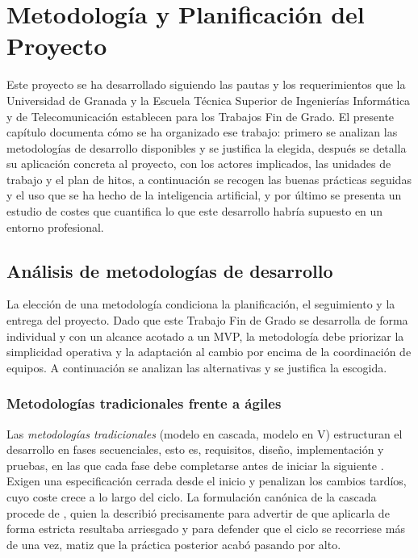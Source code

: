 \chapter{Metodología y Planificación del Proyecto}
\label{cap:metodologia}

Este proyecto se ha desarrollado siguiendo las pautas y los requerimientos que la Universidad de Granada y
la Escuela Técnica Superior de Ingenierías Informática y de Telecomunicación establecen para los Trabajos
Fin de Grado. El presente capítulo documenta cómo se ha organizado ese trabajo: primero se analizan las
metodologías de desarrollo disponibles y se justifica la elegida, después se detalla su aplicación concreta
al proyecto, con los actores implicados, las unidades de trabajo y el plan de hitos, a continuación se
recogen las buenas prácticas seguidas y el uso que se ha hecho de la inteligencia artificial, y por último se
presenta un estudio de costes que cuantifica lo que este desarrollo habría supuesto en un entorno
profesional.

\section{Análisis de metodologías de desarrollo}

La elección de una metodología condiciona la planificación, el seguimiento y la entrega del proyecto. Dado
que este Trabajo Fin de Grado se desarrolla de forma individual y con un alcance acotado a un MVP, la
metodología debe priorizar la simplicidad operativa y la adaptación al cambio por encima de la coordinación
de equipos. A continuación se analizan las alternativas y se justifica la escogida.

\subsection{Metodologías tradicionales frente a ágiles}

Las \textit{metodologías tradicionales} (modelo en cascada, modelo en V) estructuran el desarrollo en fases
secuenciales, esto es, requisitos, diseño, implementación y pruebas, en las que cada fase debe completarse
antes de iniciar la siguiente \citep{Sommerville2016}. Exigen una especificación cerrada desde el inicio y
penalizan los cambios tardíos, cuyo coste crece a lo largo del ciclo. La formulación
canónica de la cascada procede de \textcite{Royce1970}, quien la describió precisamente para advertir de que
aplicarla de forma estricta resultaba arriesgado y para defender que el ciclo se recorriese más de una vez,
matiz que la práctica posterior acabó pasando por alto.

